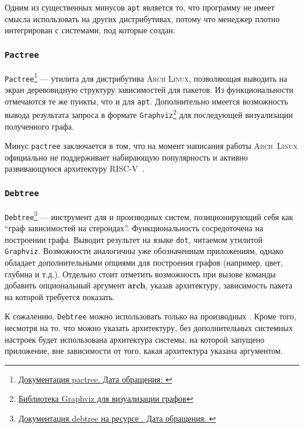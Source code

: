 Одним из существенных минусов \texttt{apt} является то, что программу не имеет смысла использовать на других дистрибутивах, потому что менеджер плотно интегрирован с системами, под которые создан.

\subsubsection{\texttt{Pactree}}
\texttt{Pactree}\footnote{\href{https://man.archlinux.org/man/extra/pacman-contrib/pactree.8.en}{Документация pactree. Дата обращения: }} --- утилита для дистрибутива \textsc{Arch Linux}, позволяющая выводить на экран деревовидную структуру зависимостей для пакетов.
Из функциональности отмечаются те же пункты, что и для \texttt{apt}. Дополнительно имеется возможность вывода результата запроса в формате \texttt{Graphviz}\footnote{\href{https://graphviz.org/}{Библиотека Graphviz для визуализации графов}} для последующей визуализации полученного графа.

Минус \texttt{pactree} заключается в том, что на момент написания работы \textsc{Arch~Linux} официально не поддерживает набирающую популярность и активно развивающуюся архитектуру \textsc{RISC-V}~\cite{RISCVSurvey}.

\subsubsection{\texttt{Debtree}}
\texttt{Debtree}\footnote{\href{https://manpages.ubuntu.com/manpages/xenial/man1/debtree.1.html}{Документация debtree на ресурсе {\ubuntu}. Дата обращения: }} --- инструмент для {\debian} и производных систем, позиционирующий себя как \enquote{граф зависимостей на стероидах}. Функциональность сосредоточена на построении графа.
Выводит результет на языке \texttt{dot}, читаемом утилитой \texttt{Graphviz}. Возможности аналогичны уже обозначенным приложениям, однако обладает дополнительными опциями для построения графов (например, цвет, глубина и т.д.).
Отдельно стоит отметить возможность при вызове команды добавить опциональный аргумент \textbf{arch}, указав архитектуру, зависимость пакета на которой требуется показать.

К сожалению, \texttt{Debtree} можно использовать только на производных {\debian}.
Кроме того, несмотря на то, что можно указать архитектуру, без дополнительных системных настроек будет использована архитектура системы, на которой запущено приложение, вне зависимости от того, какая архитектура указана аргументом.

